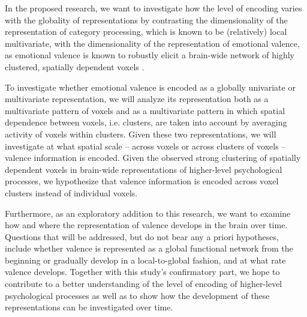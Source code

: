 \documentclass[12pt,a4paper]{article}\usepackage[]{graphicx}\usepackage[]{color}
\begin{document}
In the proposed research, we want to investigate how the level of encoding varies with the globality of representations by contrasting the dimensionality of the representation of category processing, which is known to be (relatively) local multivariate, with the dimensionality of the representation of emotional valence, as emotional valence is known to robustly elicit a brain-wide network of highly clustered, spatially dependent voxels \citep{lindquist2015,chavez2015}.     

To investigate whether emotional valence is encoded as a globally univariate or multivariate representation, we will analyze its representation both as a multivariate pattern of voxels and as a multivariate pattern in which spatial dependence between voxels, i.e. clusters, are taken into account by averaging activity of voxels within clusters. Given these two representations, we will investigate at what spatial scale -- across voxels or across clusters of voxels -- valence information is encoded.  Given the observed strong clustering of spatially dependent voxels in brain-wide representations of higher-level psychological processes, we hypothesize that valence information is encoded across voxel clusters instead of individual voxels. %

Furthermore, as an exploratory addition to this research, we want to examine how and where the representation of valence develops in the brain over time. Questions that will be addressed, but do not bear any a priori hypotheses, include whether valence is represented as a global functional network from the beginning or gradually develop in a local-to-global fashion, and at what rate valence develops. Together with this study's confirmatory part, we hope to contribute to a better understanding of the level of encoding of higher-level psychological processes as well as to show how the development of these representations can be investigated over time.\\
\end{document}
